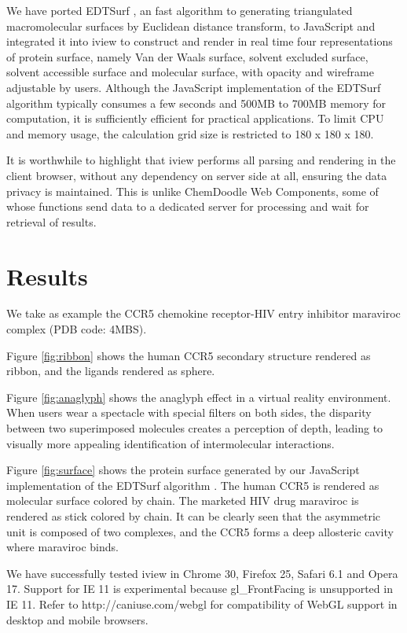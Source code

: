 \documentclass[twocolumn]{bmcart}%
\begin{document}
We have ported EDTSurf \cite{1297,1350}, an fast algorithm to generating triangulated macromolecular surfaces by Euclidean distance transform, to JavaScript and integrated it into iview to construct and render in real time four representations of protein surface, namely Van der Waals surface, solvent excluded surface, solvent accessible surface and molecular surface, with opacity and wireframe adjustable by users. Although the JavaScript implementation of the EDTSurf algorithm typically consumes a few seconds and 500MB to 700MB memory for computation, it is sufficiently efficient for practical applications. To limit CPU and memory usage, the calculation grid size is restricted to 180 x 180 x 180.

It is worthwhile to highlight that iview performs all parsing and rendering in the client browser, without any dependency on server side at all, ensuring the data privacy is maintained. This is unlike ChemDoodle Web Components, some of whose functions send data to a dedicated server for processing and wait for retrieval of results.

\section*{Results}

We take as example the CCR5 chemokine receptor-HIV entry inhibitor maraviroc complex \cite{1348} (PDB code: 4MBS).

Figure \ref{fig:ribbon} shows the human CCR5 secondary structure rendered as ribbon, and the ligands rendered as sphere.

Figure \ref{fig:anaglyph} shows the anaglyph effect in a virtual reality environment. When users wear a spectacle with special filters on both sides, the disparity between two superimposed molecules creates a perception of depth, leading to visually more appealing identification of intermolecular interactions.

Figure \ref{fig:surface} shows the protein surface generated by our JavaScript implementation of the EDTSurf algorithm \cite{1297,1350}. The human CCR5 is rendered as molecular surface colored by chain. The marketed HIV drug maraviroc is rendered as stick colored by chain. It can be clearly seen that the asymmetric unit is composed of two complexes, and the CCR5 forms a deep allosteric cavity where maraviroc binds.

We have successfully tested iview in Chrome 30, Firefox 25, Safari 6.1 and Opera 17. Support for IE 11 is experimental because gl\_FrontFacing is unsupported in IE 11. Refer to http://caniuse.com/webgl for compatibility of WebGL support in desktop and mobile browsers.
\end{document}
